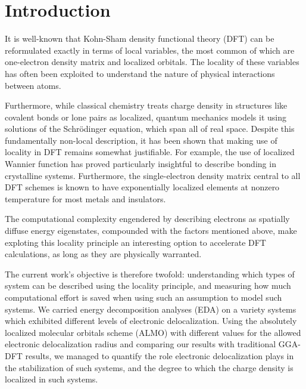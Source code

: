 \documentclass[aps,prb,twocolumn,amsmath,amssymb,superscriptaddress,longbibliography]{revtex4-1}
\begin{document}
\section{Introduction} 

It is well-known that Kohn-Sham density functional theory (DFT) can be reformulated exactly in terms of local variables, the most common of which are one-electron density matrix and localized orbitals. The locality of these variables has often been exploited to understand the nature of physical interactions between atoms.



Furthermore, while classical chemistry treats charge density in structures like covalent bonds or lone pairs as localized, quantum mechanics models it using solutions of the Schr\"{o}dinger equation, which span all of real space. Despite this fundamentally non-local description, it has been shown that making use of locality in DFT remains somewhat justifiable. For example, the use of localized Wannier function has proved particularly insightful to describe bonding in crystalline systems. Furthermore, the single-electron density matrix central to all DFT schemes is known to have exponentially localized elements at nonzero temperature for most metals and insulators.

The computational complexity engendered by describing electrons as spatially diffuse energy eigenstates, compounded with the factors mentioned above, make exploting this locality principle an interesting option to accelerate DFT calculations, as long as they are physically warranted.

The current work's objective is therefore twofold: understanding which types of system can be described using the locality principle, and measuring how much computational effort is saved when using such an assumption to model such systems. We carried energy decomposition analyses (EDA) on a variety systems which exhibited different levels of electronic delocalization. Using the absolutely localized molecular orbitals scheme (ALMO) with different values for the allowed electronic delocalization radius and comparing our results with traditional GGA-DFT results, we managed to quantify the role electronic delocalization plays in the stabilization of such systems, and the degree to which the charge density is localized in such systems.
\end{document}
